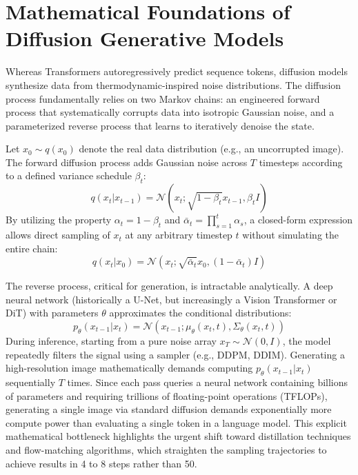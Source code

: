 \documentclass[12pt, a4paper]{report}
\begin{document}
\section{Mathematical Foundations of Diffusion Generative Models}
Whereas Transformers autoregressively predict sequence tokens, diffusion models synthesize data from thermodynamic-inspired noise distributions. The diffusion process fundamentally relies on two Markov chains: an engineered forward process that systematically corrupts data into isotropic Gaussian noise, and a parameterized reverse process that learns to iteratively denoise the state.

Let $x_0 \sim q(x_0)$ denote the real data distribution (e.g., an uncorrupted image). The forward diffusion process adds Gaussian noise across $T$ timesteps according to a defined variance schedule $\beta_t$:
\begin{equation}
    q(x_t | x_{t-1}) = \mathcal{N}(x_t; \sqrt{1 - \beta_t} x_{t-1}, \beta_t I)
\end{equation}
By utilizing the property $\alpha_t = 1 - \beta_t$ and $\bar{\alpha}_t = \prod_{s=1}^t \alpha_s$, a closed-form expression allows direct sampling of $x_t$ at any arbitrary timestep $t$ without simulating the entire chain:
\begin{equation}
    q(x_t | x_0) = \mathcal{N}(x_t; \sqrt{\bar{\alpha}_t} x_0, (1 - \bar{\alpha}_t) I)
\end{equation}

The reverse process, critical for generation, is intractable analytically. A deep neural network (historically a U-Net, but increasingly a Vision Transformer or DiT) with parameters $\theta$ approximates the conditional distributions:
\begin{equation}
    p_\theta(x_{t-1} | x_t) = \mathcal{N}(x_{t-1}; \mu_\theta(x_t, t), \Sigma_\theta(x_t, t))
\end{equation}
During inference, starting from a pure noise array $x_T \sim \mathcal{N}(0, I)$, the model repeatedly filters the signal using a sampler (e.g., DDPM, DDIM). Generating a high-resolution image mathematically demands computing $p_\theta(x_{t-1} | x_t)$ sequentially $T$ times. Since each pass queries a neural network containing billions of parameters and requiring trillions of floating-point operations (TFLOPs), generating a single image via standard diffusion demands exponentially more compute power than evaluating a single token in a language model. This explicit mathematical bottleneck highlights the urgent shift toward distillation techniques and flow-matching algorithms, which straighten the sampling trajectories to achieve results in 4 to 8 steps rather than 50.
\end{document}
